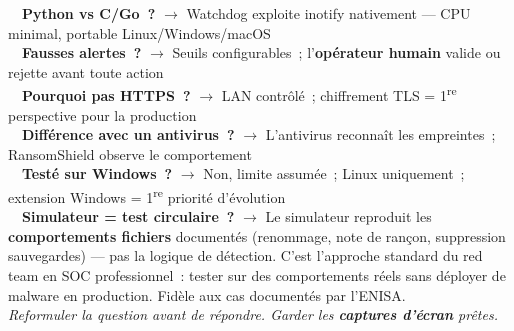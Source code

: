 \documentclass[a4paper,11pt]{article}
\begin{document}
\vspace{6pt}
\textbullet\ \ \textbf{Python vs C/Go~?} $\to$ Watchdog exploite inotify nativement --- CPU minimal, portable Linux/Windows/macOS\\[3pt]
  \textbullet\ \ \textbf{Fausses alertes~?} $\to$ Seuils configurables~; l'\textbf{opérateur humain} valide ou rejette avant toute action\\[3pt]
  \textbullet\ \ \textbf{Pourquoi pas HTTPS~?} $\to$ LAN contrôlé~; chiffrement TLS = 1\textsuperscript{re} perspective pour la production\\[3pt]
  \textbullet\ \ \textbf{Différence avec un antivirus~?} $\to$ L'antivirus reconnaît les empreintes~; RansomShield observe le comportement\\[3pt]
  \textbullet\ \ \textbf{Testé sur Windows~?} $\to$ Non, limite assumée~; Linux uniquement~; extension Windows = 1\textsuperscript{re} priorité d'évolution\\[3pt]
  \textbullet\ \ \textbf{Simulateur = test circulaire~?} $\to$ Le simulateur reproduit les \textbf{comportements fichiers} documentés (renommage, note de rançon, suppression sauvegardes) --- pas la logique de détection. C'est l'approche standard du red team en SOC professionnel~: tester sur des comportements réels sans déployer de malware en production. Fidèle aux cas documentés par l'ENISA.\\[3pt]
  \textit{Reformuler la question avant de répondre. Garder les \textbf{captures d'écran} prêtes.}
\end{document}
